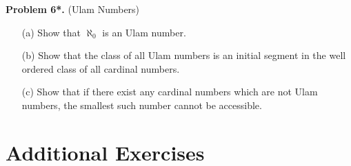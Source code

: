 \documentclass[10pt]{article}
\begin{document}
	\vspace{20pt}
	
	\noindent \textbf{Problem 6*.} (Ulam Numbers) ~
		\begin{itemize}
			\item[(a)]  Show that $\aleph_0$ is an Ulam number.
			
			\item[(b)] Show that the class of all Ulam numbers is an initial segment in the well ordered class of all cardinal numbers.
			
			\item[(c)] Show that if there exist any cardinal numbers which are not Ulam numbers, the smallest such number cannot be accessible. 
		\end{itemize}
	
	\newpage 
	\section*{Additional Exercises}
	
	\vspace{10pt}
	
\end{document}
